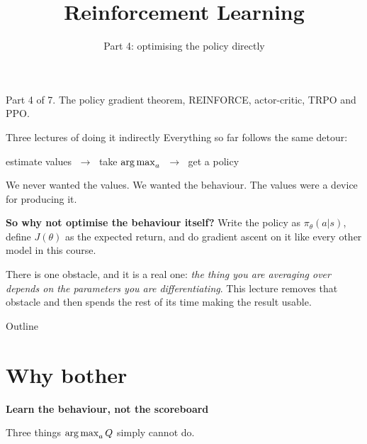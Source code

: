 \documentclass[aspectratio=169]{beamer}
\title{Reinforcement Learning}
\subtitle{Part 4: optimising the policy directly}
\author{}
\date{}
\begin{document}
\begin{frame}
  \titlepage
  \begin{center}\scriptsize\color{gray}
    Part 4 of 7. The policy gradient theorem, REINFORCE, actor-critic, TRPO and PPO.
  \end{center}
\end{frame}

\begin{frame}{Three lectures of doing it indirectly}
  \small
  Everything so far follows the same detour:

  \vskip 8pt
  \begin{center}
  \begin{tcolorbox}[colback=lightbg, colframe=popblue, boxrule=0.7pt, arc=2pt, width=0.86\textwidth]
    \begin{center}
      \small
      estimate values $\;\longrightarrow\;$ take $\mathop{\mathrm{arg\,max}}_a$ $\;\longrightarrow\;$ get a policy
    \end{center}
  \end{tcolorbox}
  \end{center}

  \vskip 10pt
  \small
  We never wanted the values. We wanted the behaviour. The values were a device for producing
  it.

  \vskip 8pt
  \begin{tcolorbox}[colback=armorange!12, colframe=armorange, boxrule=0.7pt, arc=2pt]
    \small
    \textbf{So why not optimise the behaviour itself?} Write the policy as $\pi_\theta(a|s)$,
    define $J(\theta)$ as the expected return, and do gradient ascent on it like every other
    model in this course.

    \vskip 4pt
    There is one obstacle, and it is a real one: \emph{the thing you are averaging over depends
    on the parameters you are differentiating}. This lecture removes that obstacle and then
    spends the rest of its time making the result usable.
  \end{tcolorbox}
\end{frame}

\begin{frame}{Outline}
  \tableofcontents
\end{frame}

\section{Why bother}
\begin{frame}[plain]
  \begin{center}
    \vskip 1.6cm
    {\Huge\bfseries\color{popblue}Learn the behaviour, not the scoreboard}

    \vskip 0.6cm
    {\large Three things $\mathop{\mathrm{arg\,max}}_a Q$ simply cannot do.}
  \end{center}
\end{frame}
\end{document}
